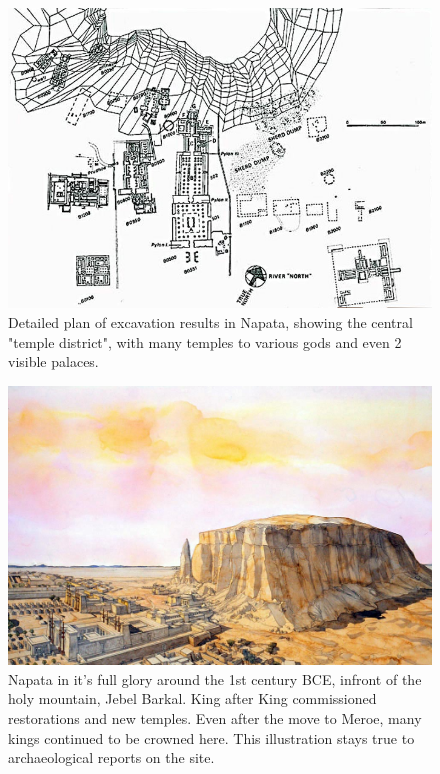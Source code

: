 \documentclass[a4paper,12pt]{scrreprt}
\begin{document}
\begin{figure}[H]
	\centering
	\includegraphics[width=\textwidth]{img/napta_temple_district}
	\caption{Detailed plan of excavation results in Napata, showing the central "temple district", with many temples to various gods and even 2 visible palaces.}
\end{figure}

\begin{figure}[H]
	\centering
	\includegraphics[width=\textwidth]{img/holy_mountain_jebel_barkal}
	\caption{Napata in it's full glory around the 1st century BCE, infront of the holy mountain, Jebel Barkal. King after King commissioned restorations and new temples. Even after the move to Meroe, many kings continued to be crowned here. This illustration stays true to archaeological reports on the site.}
\end{figure}
\end{document}
